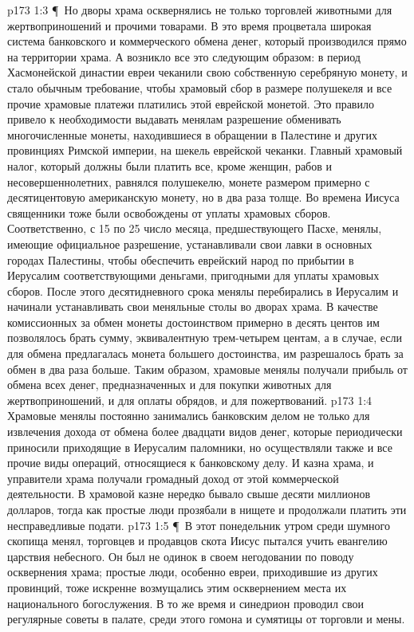 \vs p173 1:3 \P\ Но дворы храма осквернялись не только торговлей животными для жертвоприношений и прочими товарами. В это время процветала широкая система банковского и коммерческого обмена денег, который производился прямо на территории храма. А возникло все это следующим образом: в период Хасмонейской династии евреи чеканили свою собственную серебряную монету, и стало обычным требование, чтобы храмовый сбор в размере полушекеля и все прочие храмовые платежи платились этой еврейской монетой. Это правило привело к необходимости выдавать менялам разрешение обменивать многочисленные монеты, находившиеся в обращении в Палестине и других провинциях Римской империи, на шекель еврейской чеканки. Главный храмовый налог, который должны были платить все, кроме женщин, рабов и несовершеннолетних, равнялся полушекелю, монете размером примерно с десятицентовую американскую монету, но в два раза толще. Во времена Иисуса священники тоже были освобождены от уплаты храмовых сборов. Соответственно, с 15 по 25 число месяца, предшествующего Пасхе, менялы, имеющие официальное разрешение, устанавливали свои лавки в основных городах Палестины, чтобы обеспечить еврейский народ по прибытии в Иерусалим соответствующими деньгами, пригодными для уплаты храмовых сборов. После этого десятидневного срока менялы перебирались в Иерусалим и начинали устанавливать свои меняльные столы во дворах храма. В качестве комиссионных за обмен монеты достоинством примерно в десять центов им позволялось брать сумму, эквивалентную трем\hyp{}четырем центам, а в случае, если для обмена предлагалась монета большего достоинства, им разрешалось брать за обмен в два раза больше. Таким образом, храмовые менялы получали прибыль от обмена всех денег, предназначенных и для покупки животных для жертвоприношений, и для оплаты обрядов, и для пожертвований.
\vs p173 1:4 Храмовые менялы постоянно занимались банковским делом не только для извлечения дохода от обмена более двадцати видов денег, которые периодически приносили приходящие в Иерусалим паломники, но осуществляли также и все прочие виды операций, относящиеся к банковскому делу. И казна храма, и управители храма получали громадный доход от этой коммерческой деятельности. В храмовой казне нередко бывало свыше десяти миллионов долларов, тогда как простые люди прозябали в нищете и продолжали платить эти несправедливые подати.
\vs p173 1:5 \P\ В этот понедельник утром среди шумного скопища менял, торговцев и продавцов скота Иисус пытался учить евангелию царствия небесного. Он был не одинок в своем негодовании по поводу осквернения храма; простые люди, особенно евреи, приходившие из других провинций, тоже искренне возмущались этим осквернением места их национального богослужения. В то же время и синедрион проводил свои регулярные советы в палате, среди этого гомона и сумятицы от торговли и мены.
